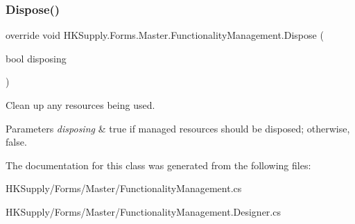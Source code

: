 \subsubsection{\texorpdfstring{Dispose()}{Dispose()}}
{\footnotesize\ttfamily override void H\+K\+Supply.\+Forms.\+Master.\+Functionality\+Management.\+Dispose (\begin{DoxyParamCaption}\item[{bool}]{disposing }\end{DoxyParamCaption})\hspace{0.3cm}{\ttfamily [protected]}}



Clean up any resources being used. 


\begin{DoxyParams}{Parameters}
{\em disposing} & true if managed resources should be disposed; otherwise, false.\\
\hline
\end{DoxyParams}


The documentation for this class was generated from the following files\+:\begin{DoxyCompactItemize}
\item 
H\+K\+Supply/\+Forms/\+Master/Functionality\+Management.\+cs\item 
H\+K\+Supply/\+Forms/\+Master/Functionality\+Management.\+Designer.\+cs\end{DoxyCompactItemize}
